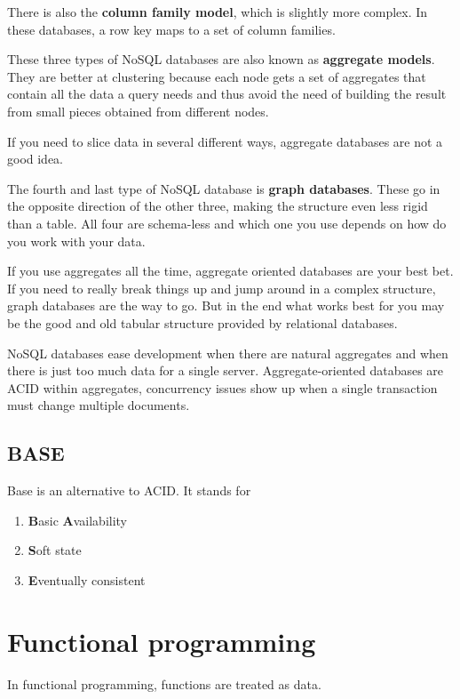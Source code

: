 \documentclass[12pt, oneside]{book}
\begin{document}
There is also the \textbf{column family model}, which is slightly more complex.
In these databases, a row key maps to a set of column families.

These three types of NoSQL databases are also known as \textbf{aggregate
models}. They are better at clustering because each node gets a set of
aggregates that contain all the data a query needs and thus avoid the need of
building the result from small pieces obtained from different nodes.

If you need to slice data in several different ways, aggregate databases are not
a good idea.

The fourth and last type of NoSQL database is \textbf{graph databases}. These go
in the opposite direction of the other three, making the structure even less
rigid than a table. All four are schema-less and which one you use depends on
how do you work with your data.

If you use aggregates all the time, aggregate oriented databases are your best
bet. If you need to really break things up and jump around in a complex
structure, graph databases are the way to go. But in the end what works best for
you may be the good and old tabular structure provided by relational databases.

NoSQL databases ease development when there are natural aggregates and when
there is just too much data for a single server.
Aggregate-oriented databases are ACID within aggregates, concurrency issues show
up when a single transaction must change multiple documents.

\section{BASE}
Base is an alternative to ACID.
It stands for

\begin{enumerate}
  \item \textbf{B}asic \textbf{A}vailability
  \item \textbf{S}oft state
  \item \textbf{E}ventually consistent
\end{enumerate}

\chapter{Functional programming}
In functional programming, functions are treated as data.

\printbibliography
\end{document}
